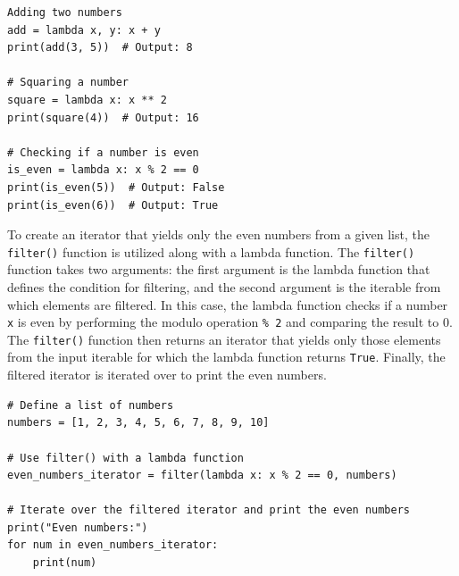 \begin{codebox}
\begin{verbatim}
Adding two numbers
add = lambda x, y: x + y
print(add(3, 5))  # Output: 8

# Squaring a number
square = lambda x: x ** 2
print(square(4))  # Output: 16

# Checking if a number is even
is_even = lambda x: x % 2 == 0
print(is_even(5))  # Output: False
print(is_even(6))  # Output: True
\end{verbatim}
\end{codebox}

To create an iterator that yields only the even numbers from a given list, the \texttt{filter()} function is utilized along with a lambda function. The \texttt{filter()} function takes two arguments: the first argument is the lambda function that defines the condition for filtering, and the second argument is the iterable from which elements are filtered. In this case, the lambda function checks if a number \texttt{x} is even by performing the modulo operation \texttt{\% 2} and comparing the result to 0. The \texttt{filter()} function then returns an iterator that yields only those elements from the input iterable for which the lambda function returns \texttt{True}. Finally, the filtered iterator is iterated over to print the even numbers.

\begin{codebox}
\begin{verbatim}
# Define a list of numbers
numbers = [1, 2, 3, 4, 5, 6, 7, 8, 9, 10]

# Use filter() with a lambda function
even_numbers_iterator = filter(lambda x: x % 2 == 0, numbers)

# Iterate over the filtered iterator and print the even numbers
print("Even numbers:")
for num in even_numbers_iterator:
    print(num)
\end{verbatim}
\end{codebox}

%




